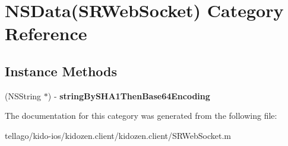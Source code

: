 \hypertarget{category_n_s_data_07_s_r_web_socket_08}{\section{N\-S\-Data(S\-R\-Web\-Socket) Category Reference}
\label{category_n_s_data_07_s_r_web_socket_08}
}
\subsection*{Instance Methods}
\begin{DoxyCompactItemize}
\item 
\hypertarget{category_n_s_data_07_s_r_web_socket_08_ac3c0d048275041f969c6b6d7e3f9b5ba}{(N\-S\-String $\ast$) -\/ {\bfseries string\-By\-S\-H\-A1\-Then\-Base64\-Encoding}}\label{category_n_s_data_07_s_r_web_socket_08_ac3c0d048275041f969c6b6d7e3f9b5ba}

\end{DoxyCompactItemize}


The documentation for this category was generated from the following file\-:\begin{DoxyCompactItemize}
\item 
tellago/kido-\/ios/kidozen.\-client/kidozen.\-client/S\-R\-Web\-Socket.\-m\end{DoxyCompactItemize}
